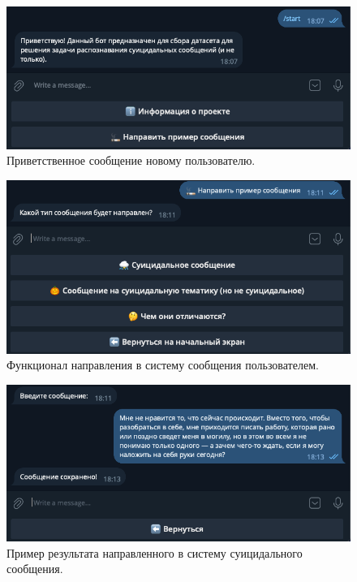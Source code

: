\begin{figure}[H]
	\centering
	\includegraphics[width=\textwidth]{inc/teleg1.png}
	\caption{ Приветственное сообщение новому пользователю. }
	\label{img:teleg1}
\end{figure}

\begin{figure}[H]
	\centering
	\includegraphics[width=\textwidth]{inc/teleg2.png}
	\caption{ Функционал направления в систему сообщения пользователем. }
	\label{img:teleg2}
\end{figure}

\begin{figure}[H]
	\centering
	\includegraphics[width=\textwidth]{inc/teleg3.png}
	\caption{ Пример результата направленного в систему суицидального сообщения. }
	\label{img:teleg3}
\end{figure}

